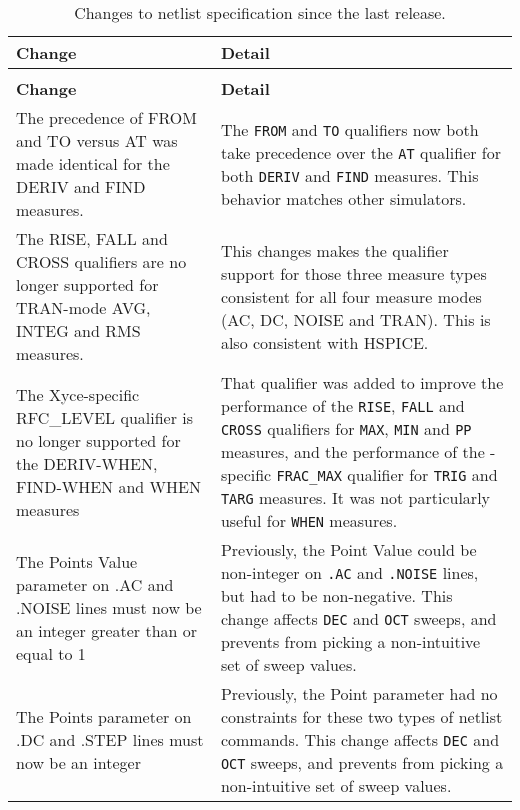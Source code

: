 {
\small

\begin{longtable}[h] {>{\raggedright\small}m{2in}|>{\raggedright\let\\\tabularnewline\small}m{3.5in}}
  \caption{Changes to netlist specification since the last release.\label{newUsage}} \\ \hline
  \rowcolor{XyceDarkBlue}
  \color{white}\textbf{Change} &
  \color{white}\textbf{Detail} \\ \hline \endfirsthead
  \caption[]{Changes to netlist specification since the last release.\label{newUsage}} \\ \hline
  \rowcolor{XyceDarkBlue}
  \color{white}\textbf{Change} &
  \color{white}\textbf{Detail} \\ \hline \endhead

The precedence of FROM and TO versus AT was made identical for the DERIV
and FIND measures. & The \texttt{FROM} and \texttt{TO} qualifiers now both
take precedence over the \texttt{AT} qualifier for both \texttt{DERIV}
and \texttt{FIND} measures.  This behavior matches other simulators.
\\ \hline

The RISE, FALL and CROSS qualifiers are no longer supported for TRAN-mode
AVG, INTEG and RMS measures. & This changes makes the qualifier support
for those three measure types consistent for all four measure modes
(AC, DC, NOISE and TRAN).  This is also consistent with HSPICE.
\\ \hline

The Xyce-specific RFC\_LEVEL qualifier is no longer supported for the
DERIV-WHEN, FIND-WHEN and WHEN measures & That qualifier was added to
improve the performance of the \texttt{RISE}, \texttt{FALL} and
\texttt{CROSS} qualifiers for \texttt{MAX}, \texttt{MIN} and \texttt{PP}
measures, and the performance of the \Xyce{}-specific \texttt{FRAC\_MAX}
qualifier for \texttt{TRIG} and \texttt{TARG} measures.  It was not
particularly useful for \texttt{WHEN} measures.
\\ \hline

The Points Value parameter on .AC and .NOISE lines must now be an integer
greater than or equal to 1 & Previously, the Point Value could be
non-integer on \texttt{.AC} and \texttt{.NOISE} lines, but had to be
non-negative.  This change affects \texttt{DEC} and \texttt{OCT} sweeps,
and prevents \Xyce{} from picking a non-intuitive set of sweep values.
\\ \hline

The Points parameter on .DC and .STEP lines must now be an integer
& Previously, the Point parameter had no constraints for these
two types of netlist commands.  This change affects \texttt{DEC} and
\texttt{OCT} sweeps, and prevents \Xyce{} from picking a non-intuitive
set of sweep values.
\\ \hline

\end{longtable}
}
